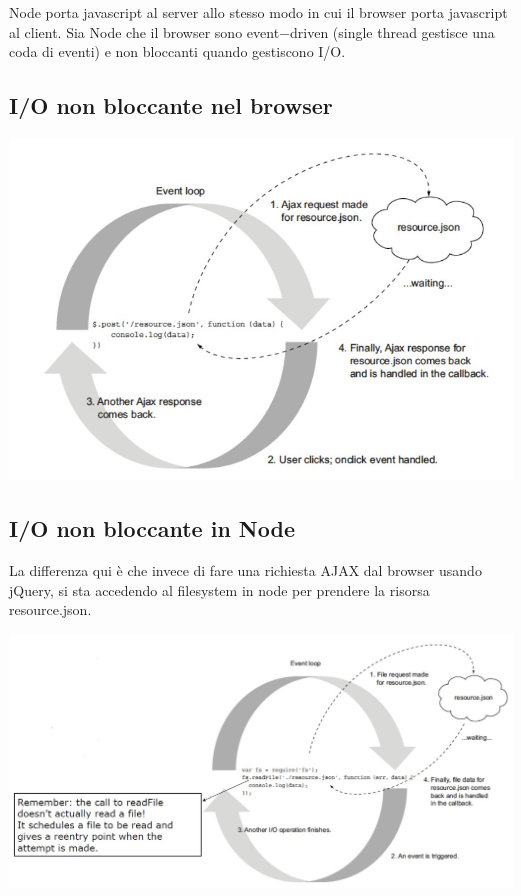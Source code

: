 Node porta javascript al server allo stesso modo in cui il browser porta javascript al client. Sia Node che il browser sono event$-$driven (single thread gestisce una coda di eventi) e non bloccanti quando gestiscono I/O.\\

\subsection{I/O non bloccante nel browser}
\begin{center}
    \includegraphics[scale = 0.4]{Images/TecnologieWeb/8/Node.jpg}
\end{center}

\subsection{I/O non bloccante in Node}
La differenza qui è che invece di fare una richiesta AJAX dal browser usando jQuery, si sta accedendo al filesystem in node per prendere la risorsa resource.json.
\begin{center}
    \includegraphics[scale = 0.4]{Images/TecnologieWeb/8/IOnonbloccanteNode.jpg}
\end{center}


